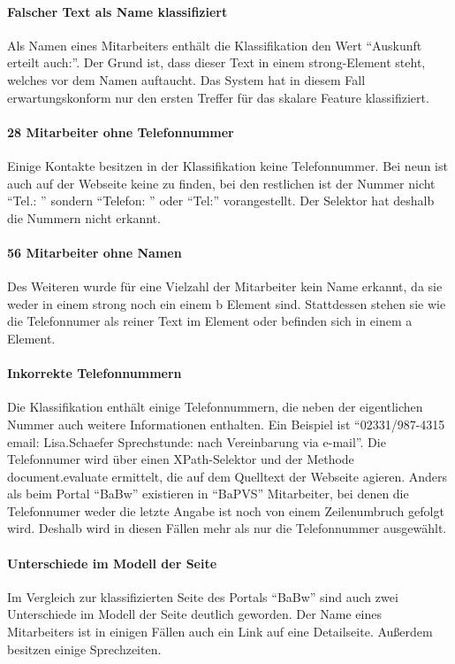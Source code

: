     \paragraph{Falscher Text als Name klassifiziert}
    Als Namen eines Mitarbeiters enthält die Klassifikation
    den Wert "`Auskunft erteilt auch:"'.
    Der Grund ist, dass dieser Text in einem strong-Element steht,
    welches vor dem Namen auftaucht.
    Das System hat in diesem Fall erwartungskonform nur den ersten
    Treffer für das skalare Feature klassifiziert.
        
    \paragraph{28 Mitarbeiter ohne Telefonnummer}
    Einige Kontakte besitzen in der Klassifikation keine Telefonnummer.
    Bei neun ist auch auf der Webseite keine zu finden,
    bei den restlichen ist der Nummer nicht "`Tel.: "'
    sondern "`Telefon: "' oder "`Tel:"' vorangestellt.
    Der Selektor hat deshalb die Nummern nicht erkannt.
    
    \paragraph{56 Mitarbeiter ohne Namen}
    Des Weiteren wurde für eine Vielzahl der Mitarbeiter kein Name erkannt,
    da sie weder in einem strong noch ein einem b Element sind.
    Stattdessen stehen sie wie die Telefonnumer als reiner Text im Element
    oder befinden sich in einem a Element.

    \paragraph{Inkorrekte Telefonnummern}
    Die Klassifikation enthält einige Telefonnummern,
    die neben der eigentlichen Nummer auch weitere Informationen enthalten.
    Ein Beispiel ist "`02331/987-4315 email: Lisa.Schaefer Sprechstunde: nach Vereinbarung via e-mail"'.
    Die Telefonnumer wird über einen XPath-Selektor und der Methode document.evaluate ermittelt,
    die auf dem Quelltext der Webseite agieren.
    Anders als beim Portal "`BaBw"' existieren in "`BaPVS"' Mitarbeiter,
    bei denen die Telefonnumer weder die letzte Angabe ist
    noch von einem Zeilenumbruch gefolgt wird.
    Deshalb wird in diesen Fällen mehr als nur die Telefonnummer ausgewählt.

    \paragraph{Unterschiede im Modell der Seite}
    Im Vergleich zur klassifizierten Seite des Portals "`BaBw"'
    sind auch zwei Unterschiede im Modell der Seite deutlich geworden.
    Der Name eines Mitarbeiters ist in einigen Fällen
    auch ein Link auf eine Detailseite.
    Außerdem besitzen einige Sprechzeiten.

